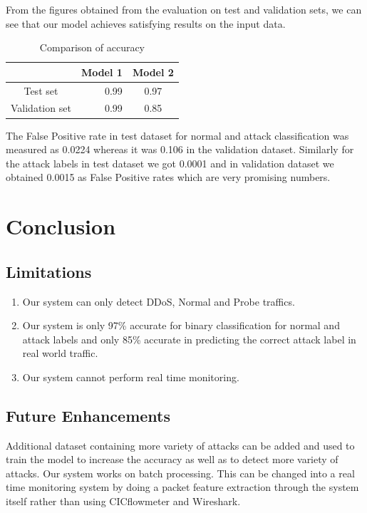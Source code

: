 From the figures obtained from the evaluation on test and validation sets, we can see that our model achieves satisfying results on the input data. \par
\begin{table}[tbh]
	\centering
	\begin{tabular}{|c|r|c|} %
		\hline %
		  &Model 1 &Model 2 \\
		\hline %
		Test set &0.99 &0.97 \\
		\hline %
		Validation set &0.99 &0.85 \\
		\hline
	\end{tabular}
	\caption{Comparison of accuracy}
	\label{Accuracy comparison}
\end{table}
The False Positive rate in test dataset for normal and attack classification was measured as 0.0224 whereas it was 0.106 in the validation dataset. Similarly for the attack labels in test dataset we got 0.0001 and in validation dataset we obtained 0.0015 as False Positive rates which are very promising numbers.
\chapter{Conclusion}
\vspace{-18pt}
\section{Limitations}
\vspace{-18pt}
\begin{enumerate}[label=\roman*.]
	\item Our system can only detect DDoS, Normal and Probe traffics.
	\item Our system is only 97\% accurate for binary classification for normal and attack labels and only 85\% accurate in predicting the correct attack label in real world traffic.
	\item Our system cannot perform real time monitoring.
\end{enumerate}
\section{Future Enhancements}
\vspace{-18pt}
Additional dataset containing more variety of attacks can be added and used to train the model to increase the accuracy as well as to detect more variety of attacks. Our system works on batch processing. This can be changed into a real time monitoring system by doing a packet feature extraction through the system itself rather than using CICflowmeter and Wireshark.
